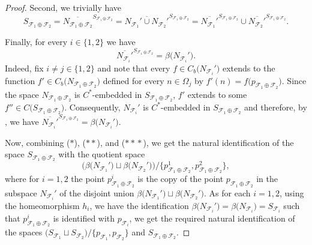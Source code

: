 \documentclass[a4paper,11pt,fleqn]{amsart}
\theoremstyle{definition}
\theoremstyle{remark}
\numberwithin{equation}{section}
\newcommand{\fF}{\mathcal{F}}
\begin{document}
\begin{proof}
    Second, we trivially have
    \[\tag{$**$}S_{\fF_1\oplus \fF_2}=\overline{N_{\fF_1\oplus \fF_2}}^{S_{\fF_1\oplus \fF_2}}=\overline{N_{\fF_1}'\cup N_{\fF_2}'}^{S_{\fF_1\oplus \fF_2}}=\overline{N_{\fF_1}'}^{S_{\fF_1\oplus \fF_2}}\cup\overline{N_{\fF_2}'}^{S_{\fF_1\oplus \fF_2}}.\]

    Finally, for every $i\in\{1,2\}$ we have
    \[\tag{$*\!*\!*$}\overline{N_{\fF_i}'}^{S_{\fF_1\oplus \fF_2}}=\beta\big(N_{\fF_i}'\big).\]
    Indeed, fix $i\neq j\in\{1,2\}$ and note that every $f\in C_b\big(N_{\fF_i}'\big)$ extends to the function $f'\in C_b\big(N_{\fF_1\oplus \fF_2}\big)$ defined for every $n\in \Omega_{j}$ by $f'(n)=f\big(p_{\fF_1\oplus \fF_2}\big)$. Since the space $N_{\fF_1\oplus \fF_2}$ is $C^*$-embedded in $S_{\fF_1\oplus \fF_2}$, $f'$ extends to some $f''\in C\big(S_{\fF_1\oplus \fF_2}\big)$. Consequently, $N_{\fF_i}'$ is $C^*$-embedded in $S_{\fF_1\oplus \fF_2}$ and therefore, by \cite[Section 6.9]{GJ60}, we have $\overline{N_{\fF_i}'}^{S_{\fF_1\oplus \fF_2}}=\beta\big(N_{\fF_i}'\big)$.

    Now, combining ($*$), ($**$), and ($*\!*\!*$), we get the natural identification of the space $S_{\fF_1\oplus\fF_2}$ with the quotient space
    \[\Big(\beta\big(N_{\fF_1}'\big)\sqcup\beta\big(N_{\fF_2}'\big)\Big)/\big\{p_{\fF_1\oplus\fF_2}^1,p_{\fF_1\oplus\fF_2}^2\big\},\]
    where for $i=1,2$ the point $p_{\fF_1\oplus\fF_2}^i$ is the copy of the point $p_{\fF_1\oplus\fF_2}$ in the subspace $N_{\fF_i}'$ of the disjoint union $\beta\big(N_{\fF_1}'\big)\sqcup\beta\big(N_{\fF_2}'\big)$. As for each $i=1,2$, using the homeomorphism $h_i$, we have the identification $\beta\big(N_{\fF_i}'\big)=\beta\big(N_{\fF_i}\big)=S_{\fF_i}$ such that $p_{\fF_1\oplus\fF_2}^i$ is identified with $p_{\fF_i}$, we get the required natural identification of the spaces $\big(S_{\fF_1}\sqcup S_{\fF_2}\big)/\big\{p_{\fF_1},p_{\fF_2}\big\}$ and $S_{\fF_1\oplus \fF_2}$.
\end{proof}
\end{document}
